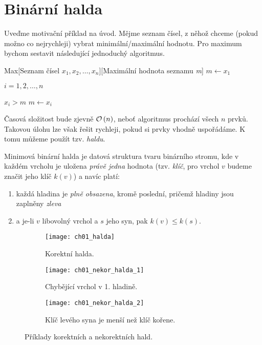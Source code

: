 \section{Binární halda}\label{sec:halda}

Uveďme motivační příklad na úvod. Mějme seznam čísel, z něhož chceme (pokud možno co nejrychleji) vybrat minimální/maximální hodnotu. Pro maximum bychom sestavit následující jednoduchý algoritmus.
\begin{pseudo}{Max}[Seznam čísel $x_1,x_2,\dots,x_n$][Maximální hodnota seznamu \textit{m}]
    $m\gets x_1$\\
    \begin{For}{$i=1,2,\dots,n$}
        \begin{If}{$x_i>m$}
            $m\gets x_i$
        \end{If}
    \end{For}
\end{pseudo}

Časová složitost bude zjevně $\mathcal{O}\left(n\right)$, neboť algoritmus prochází všech $n$ prvků. Takovou úlohu lze však řešit rychleji, pokud si prvky vhodně uspořádáme. K tomu můžeme použít tzv. \emph{haldu}. 
\begin{definition}\label{def:binarni_halda}
    Minimová binární halda je datová struktura tvaru binárního stromu, kde v každém vrcholu je uložena \emph{právě jedna} hodnota (tzv. \emph{klíč}, pro vrchol $v$ budeme značit jeho klíč $k(v)$) a navíc platí:
    \begin{enumerate}[label=(\roman*)]
        \item\label{binhalda_podminka_1} každá hladina je \emph{plně obsazena}, kromě poslední, pričemž hladiny jsou zaplněny \emph{zleva}
        \item\label{binhalda_podminka_2} a je-li $v$ libovolný vrchol a $s$ jeho syn, pak $k(v)\leqslant k(s)$.
    \end{enumerate}
\end{definition}

\begin{figure}[h]
    \centering
    \begin{subfigure}{6cm}
        \centering
        \texttt{[image: ch01\_halda]}
        \caption{Korektní halda.}
        \label{subfig:korektni_halda}
    \end{subfigure}
    \quad
    \begin{subfigure}{5cm}
        \centering
        \texttt{[image: ch01\_nekor\_halda\_1]}
        \caption{Chybějící vrchol v 1. hladině.}
        \label{subfig:nekorektni_halda_1}
    \end{subfigure}
    \quad
    \begin{subfigure}{5cm}
        \centering
        \texttt{[image: ch01\_nekor\_halda\_2]}
        \caption{Klíč levého syna je menší než klíč kořene.}
        \label{subfig:nekorektni_halda_2}
    \end{subfigure}
    \caption{Příklady korektních a nekorektních hald.}
    \label{fig:halda_modely}
\end{figure}

